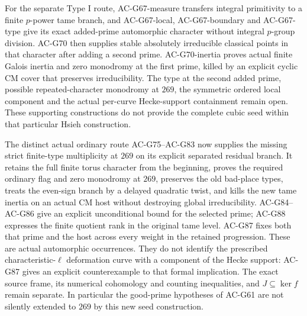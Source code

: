\documentclass[11pt,a4paper]{article}
\theoremstyle{definition}
\theoremstyle{remark}
\begin{document}
For the separate Type I route, AC-G67-measure transfers integral
primitivity to a finite $p$-power tame branch, and
AC-G67-local, AC-G67-boundary and AC-G67-type give its exact added-prime
automorphic character without integral $p$-group division.
AC-G70 then supplies stable absolutely irreducible classical points in
that character after adding a second prime. AC-G70-inertia proves actual
finite Galois inertia and zero monodromy at the first prime, killed by an
explicit cyclic CM cover that preserves irreducibility. The type at the
second added prime, possible repeated-character monodromy at $269$, the
symmetric ordered local component and the actual per-curve Hecke-support
containment remain open. These supporting constructions do not provide
the complete cubic seed within that particular Hsieh construction.

The distinct actual ordinary route AC-G75--AC-G83 now supplies
the missing strict finite-type multiplicity at $269$ on its
explicit separated residual branch.  It retains the full finite
torus character from the beginning, proves the required ordinary
flag and zero monodromy at $269$, preserves the old bad-place
types, treats the even-sign branch by a delayed quadratic twist,
and kills the new tame inertia on an actual CM host without
destroying global irreducibility.  AC-G84--AC-G86 give an explicit
unconditional bound for the selected prime; AC-G88 expresses the
finite quotient rank in the original tame level.  AC-G87 fixes
both that prime and the host across every weight in the retained
progression.  These are actual automorphic occurrences.  They do
not identify the prescribed characteristic-$\ell$ deformation
curve with a component of the Hecke support: AC-G87 gives an
explicit counterexample to that formal implication.  The exact
source frame, its numerical cohomology and counting inequalities,
and $J\subseteq\ker f$ remain separate.  In particular the
good-prime hypotheses of AC-G61 are not silently extended to
$269$ by this new seed construction.
\end{document}

